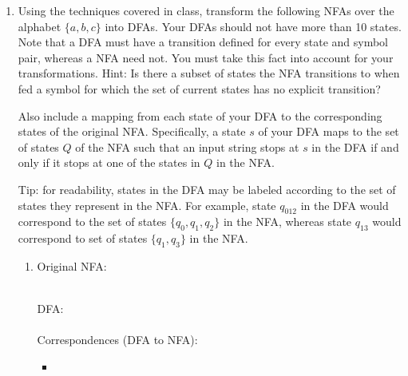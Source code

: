 \documentclass[11pt]{article}
\begin{document}
\begin{enumerate}
\item Using the techniques covered in class, transform the following NFAs over the alphabet $\{a, b, c\}$ into DFAs. Your DFAs should not have more than 10 states.  Note that a DFA must have a transition defined for every state and symbol pair, whereas a NFA need not. You must take this fact into account for your transformations. Hint: Is there a subset of states the NFA transitions to when fed a symbol for which the set of current states has no explicit transition?

Also include a mapping from each state of your DFA to the corresponding states of the original NFA.  Specifically, a state $s$ of your DFA maps to the set of states $Q$ of the NFA such that an input string stops at $s$ in the DFA if and only if it stops at one of the states in $Q$ in the NFA.

Tip: for readability, states in the DFA may be labeled according to the set of states they represent in the NFA.  For example, state $q_{012}$ in the DFA would correspond to the set of states $\{q_0, q_1, q_2\}$ in the NFA, whereas state $q_{13}$ would correspond to set of states $\{q_1, q_3\}$ in the NFA.


\begin{enumerate}
    \item Original NFA:\\
    \\
    DFA: \\
    \\
    Correspondences (DFA to NFA):
    \begin{itemize}
        \item %
    \end{itemize}


\end{enumerate}
\end{enumerate}
\end{document}
